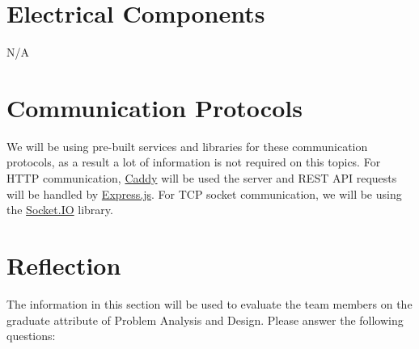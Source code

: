 \documentclass[12pt, titlepage]{article}
\begin{document}
	\section{Electrical Components}
	N/A
	
	\section{Communication Protocols}
	
	We will be using pre-built services and libraries for these communication protocols, as a result a lot of information is not required on this topics. For HTTP communication, \href{https://caddyserver.com/docs/}{Caddy} will be used the server and REST API requests will be handled by \href{https://expressjs.com/en/guide/routing.html}{Express.js}. For TCP socket communication, we will be using the \href{https://socket.io/docs/v4/server-api/}{Socket.IO} library.
	
	\section{Reflection}
	
	The information in this section will be used to evaluate the team members on the
	graduate attribute of Problem Analysis and Design.  Please answer the following questions:
	
\end{document}
